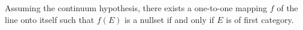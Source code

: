 Assuming the continuum hypothesis, there exists a one-to-one mapping $f$ of the line onto itself such that $f(E)$ is a nullset if and only if $E$ is of first category.
